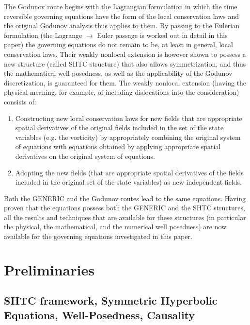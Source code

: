 \documentclass[twoside]{article}
\begin{document}
The Godunov route begins with the Lagrangian formulation in which the time 
reversible governing equations have the form of the local conservation laws and 
the original Godunov analysis thus applies to them. By passing to the Eulerian 
formulation (the Lagrange $\rightarrow$ Euler passage is worked out in detail 
in this 
paper) the governing equations do not remain to be, at least in general, local 
conservation laws. Their weakly nonlocal extension is however shown to possess 
a new structure (called SHTC structure) that also allows symmetrization, and 
thus the mathematical well posedness, as well as the applicability of the 
Godunov discretization,  is guaranteed for them. The weakly nonlocal extension 
(having the physical meaning, for example, of including dislocations into the 
consideration) consists of:
\begin{enumerate}
\item  Constructing new local conservation laws for new fields that are 
appropriate spatial derivatives of the original fields included in the set of 
the state variables (e.g. the vorticity) by appropriately combining the 
original system of equations with  equations obtained by applying   appropriate 
spatial derivatives on the original system of equations.
\item Adopting the new fields (that are appropriate spatial derivatives of the 
fields included in the original set of the state variables)  as new independent 
fields. 
\end{enumerate}

Both the GENERIC and the Godunov routes lead to the same equations. Having 
proven that the equations  possess both the GENERIC and the SHTC structures, 
all the results and techniques that are available for these structures (in 
particular the physical, the mathematical, and the numerical well posedness) 
are now available for the governing equations investigated in this paper.


\section{Preliminaries}\label{sec.preliminaries}



\subsection{SHTC framework, Symmetric Hyperbolic Equations, Well-Posedness, 
Causality}\label{sec.prem.shtc}
\end{document}
